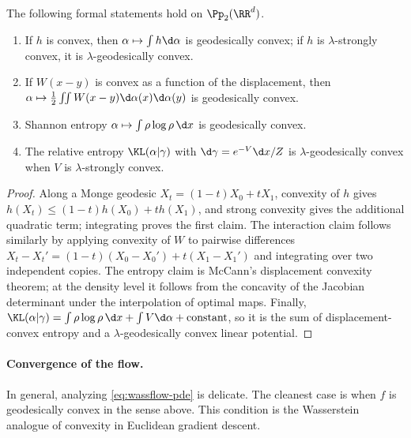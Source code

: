 \begin{prop}\label{prop-basic-geodesic-convexity}
	The following formal statements hold on $\Pp_2(\RR^d)$.
	\begin{enumerate}
		\item If $h$ is convex, then $\alpha\mapsto\int h\d\alpha$ is geodesically convex; if $h$ is $\lambda$-strongly convex, it is $\lambda$-geodesically convex.
		\item If $W(x-y)$ is convex as a function of the displacement, then $\alpha\mapsto\frac12\iint W(x-y)\d\alpha(x)\d\alpha(y)$ is geodesically convex.
		\item Shannon entropy $\alpha\mapsto\int\rho\log\rho\,\d x$ is geodesically convex.
		\item The relative entropy $\KL(\alpha|\gamma)$ with $\d\gamma=e^{-V}\d x/Z$ is $\lambda$-geodesically convex when $V$ is $\lambda$-strongly convex.
	\end{enumerate}
\end{prop}
\begin{proof}
	Along a Monge geodesic $X_t=(1-t)X_0+tX_1$, convexity of $h$ gives $h(X_t)\leq(1-t)h(X_0)+t h(X_1)$, and strong convexity gives the additional quadratic term; integrating proves the first claim. The interaction claim follows similarly by applying convexity of $W$ to pairwise differences $X_t-X_t'=(1-t)(X_0-X_0')+t(X_1-X_1')$ and integrating over two independent copies. The entropy claim is McCann's displacement convexity theorem; at the density level it follows from the concavity of the Jacobian determinant under the interpolation of optimal maps. Finally, $\KL(\alpha|\gamma)=\int\rho\log\rho\,\d x+\int V\d\alpha+\mathrm{constant}$, so it is the sum of displacement-convex entropy and a $\lambda$-geodesically convex linear potential.
\end{proof}

\paragraph{Convergence of the flow.}

In general, analyzing \eqref{eq:wassflow-pde} is delicate. The cleanest case is when $f$ is geodesically convex in the sense above. This condition is the Wasserstein analogue of convexity in Euclidean gradient descent.

